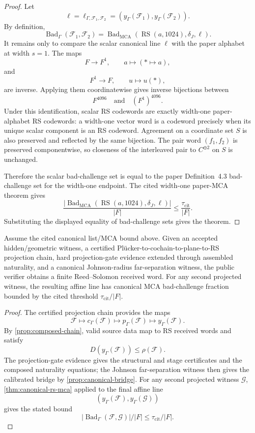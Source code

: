 \begin{proof}
Let
\[
  \ell=\ell_{\Gamma,\mathcal F_1,\mathcal F_2}
  =
  (y_\Gamma(\mathcal F_1),y_\Gamma(\mathcal F_2)).
\]
By definition,
\[
  \operatorname{Bad}_{\Gamma}(\mathcal F_1,\mathcal F_2)
  =
  \operatorname{Bad}_{\mathrm{MCA}}
  (\operatorname{RS}(a,1024),\delta_J,\ell).
\]
It remains only to compare the scalar canonical line \(\ell\) with the paper
alphabet at width \(s=1\). The maps
\[
  F\longrightarrow F^1,\qquad a\longmapsto(\ast\mapsto a),
\]
and
\[
  F^1\longrightarrow F,\qquad u\longmapsto u(\ast),
\]
are inverse. Applying them coordinatewise gives inverse bijections between
\[
  F^{4096}
  \quad\text{and}\quad
  (F^1)^{4096}.
\]
Under this identification, scalar RS codewords are exactly width-one
paper-alphabet RS codewords: a width-one vector word is a codeword precisely
when its unique scalar component is an RS codeword. Agreement on a coordinate
set \(S\) is also preserved and reflected by the same bijection. The pair word
\((f_1,f_2)\) is preserved componentwise, so closeness of the interleaved pair
to \(C^{\oplus2}\) on \(S\) is unchanged.

Therefore the scalar bad-challenge set is equal to the paper Definition~4.3
bad-challenge set for the width-one endpoint. The cited width-one paper-MCA
theorem gives
\[
  \frac{
    |\operatorname{Bad}_{\mathrm{MCA}}
      (\operatorname{RS}(a,1024),\delta_J,\ell)|
  }{|F|}
  \le
  \frac{\tau_{\mathrm{cit}}}{|F|}.
\]
Substituting the displayed equality of bad-challenge sets gives the theorem.
\end{proof}

\begin{corollary}\label{cor:verifier-rs-mca}
Assume the cited canonical list/MCA bound above. Given an accepted
hidden/geometric witness, a certified
Pl\"ucker-to-cochain-to-plane-to-RS projection chain, hard projection-gate
evidence extended through assembled naturality, and a canonical
Johnson-radius far-separation witness, the public verifier obtains a finite
Reed--Solomon received word. For any second projected witness, the resulting
affine line has canonical MCA bad-challenge fraction bounded by the cited
threshold \(\tau_{\mathrm{cit}}/|F|\).
\end{corollary}

\begin{proof}
The certified projection chain provides the maps
\[
  \mathcal F\longmapsto
  c_\Gamma(\mathcal F)\longmapsto
  p_\Gamma(\mathcal F)\longmapsto
  y_\Gamma(\mathcal F).
\]
By \cref{prop:composed-chain}, valid source data map to RS received words and
satisfy
\[
  D(y_\Gamma(\mathcal F))\le\rho(\mathcal F).
\]
The projection-gate evidence gives the structural and stage certificates and
the composed naturality equations; the Johnson far-separation witness then
gives the calibrated bridge by \cref{prop:canonical-bridge}. For any second
projected witness
\(\mathcal G\), \cref{thm:canonical-rs-mca} applied to the final affine line
\[
  (y_\Gamma(\mathcal F),y_\Gamma(\mathcal G))
\]
gives the stated bound
\[
  |\operatorname{Bad}_{\Gamma}(\mathcal F,\mathcal G)|/|F|
  \le \tau_{\mathrm{cit}}/|F|.
\]
\end{proof}

